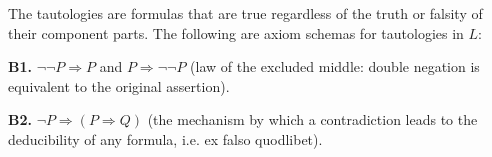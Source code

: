 The tautologies are formulas that are true regardless of the truth or falsity of their component parts. The following are axiom schemas for tautologies in $L$:

\textbf{B1.} $\neg\neg P \Rightarrow P$ and $P \Rightarrow \neg\neg P$ (law of the excluded middle: double negation is equivalent to the original assertion).

\textbf{B2.} $\neg P \Rightarrow (P \Rightarrow Q)$ (the mechanism by which a contradiction leads to the deducibility of any formula, i.e. ex falso quodlibet).
